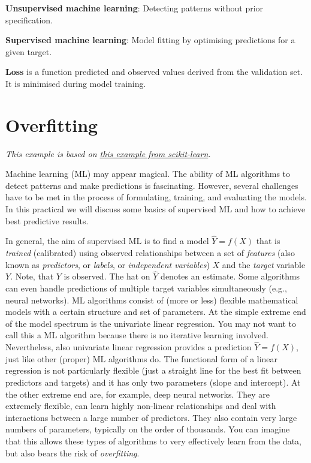 \documentclass[
]{book}
\begin{document}
\textbf{Unsupervised machine learning}: Detecting patterns without prior specification.

\textbf{Supervised machine learning}: Model fitting by optimising predictions for a given target.

\textbf{Loss} is a function predicted and observed values derived from the validation set. It is minimised during model training.

\hypertarget{overfitting}{%
\section{Overfitting}\label{overfitting}}

\emph{This example is based on \href{https://scikit-learn.org/stable/auto_examples/model_selection/plot_underfitting_overfitting.html}{this example from scikit-learn}.}

Machine learning (ML) may appear magical. The ability of ML algorithms to detect patterns and make predictions is fascinating. However, several challenges have to be met in the process of formulating, training, and evaluating the models. In this practical we will discuss some basics of supervised ML and how to achieve best predictive results.

In general, the aim of supervised ML is to find a model \(\hat{Y} = f(X)\) that is \emph{trained} (calibrated) using observed relationships between a set of \emph{features} (also known as \emph{predictors}, or \emph{labels}, or \emph{independent variables}) \(X\) and the \emph{target} variable \(Y\). Note, that \(Y\) is observed. The hat on \(\hat{Y}\) denotes an estimate. Some algorithms can even handle predictions of multiple target variables simultaneously (e.g., neural networks). ML algorithms consist of (more or less) flexible mathematical models with a certain structure and set of parameters. At the simple extreme end of the model spectrum is the univariate linear regression. You may not want to call this a ML algorithm because there is no iterative learning involved. Nevertheless, also univariate linear regression provides a prediction \(\hat{Y} = f(X)\), just like other (proper) ML algorithms do. The functional form of a linear regression is not particularly flexible (just a straight line for the best fit between predictors and targets) and it has only two parameters (slope and intercept). At the other extreme end are, for example, deep neural networks. They are extremely flexible, can learn highly non-linear relationships and deal with interactions between a large number of predictors. They also contain very large numbers of parameters, typically on the order of thousands. You can imagine that this allows these types of algorithms to very effectively learn from the data, but also bears the risk of \emph{overfitting}.
\end{document}
